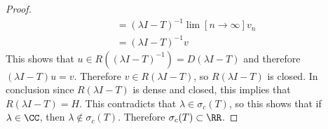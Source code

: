 \documentclass[11pt, oneside]{article}
\begin{document}
\begin{enumerate}
\begin{proof}
\begin{align*}
        &= (\lambda I - T)^{-1} \lim[n \to \infty]{v_n} \\
        &= (\lambda I - T)^{-1} v
      \end{align*}
      This shows that $u \in R((\lambda I - T)^{-1}) = D(\lambda I - T)$ and
      therefore $(\lambda I - T)u = v$.
      Therefore $v \in R(\lambda I - T)$, so $R(\lambda I - T)$ is closed.
      In conclusion since $R(\lambda I - T)$ is dense and closed, this implies
      that $R(\lambda I - T) = H$.
      This contradicts that $\lambda \in \sigma_c(T)$, so this shows that if
      $\lambda \in \CC$, then $\lambda \not\in \sigma_c(T)$.
      Therefore $\sigma_c(T) \subset \RR$.
    \end{proof}
\end{enumerate}
\end{document}
